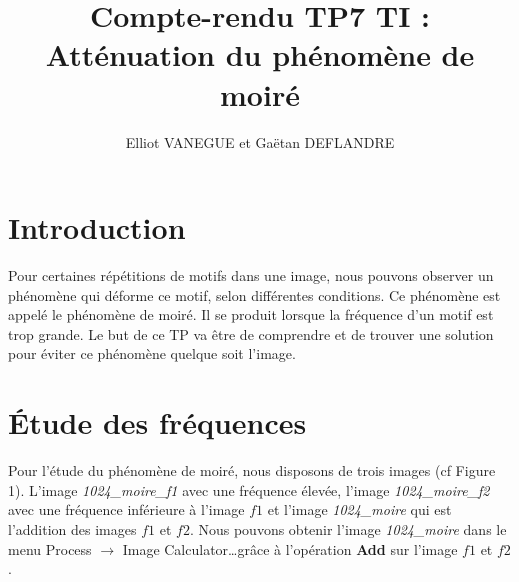 \documentclass[a4paper,11pt]{article}
\title{Compte-rendu TP7 TI : Atténuation du phénomène de moiré}
\author{Elliot VANEGUE et Gaëtan DEFLANDRE}
\begin{document}


  \maketitle
  
  \mbox{}
  \newpage
  \clearpage
  
  \section*{Introduction}
  Pour certaines répétitions de motifs dans une image, nous pouvons observer un phénomène qui déforme ce motif, selon différentes conditions. 
  Ce phénomène est appelé le phénomène de moiré. Il se produit lorsque la fréquence d’un motif est trop grande. Le but de ce TP va être de 
  comprendre et de trouver une solution pour éviter ce phénomène quelque soit l’image.\\
 
  \section{Étude des fréquences}
  Pour l’étude du phénomène de moiré, nous disposons de trois images (cf Figure 1). L’image \textit{1024\_moire\_f1} avec une fréquence élevée, 
  l’image \textit{1024\_moire\_f2} avec une fréquence inférieure à l’image $f1$ et l’image \textit{1024\_moire} qui est l’addition des images 
  $f1$ et $f2$. Nous pouvons obtenir l’image \textit{1024\_moire} dans le menu Process $\rightarrow$ Image Calculator\ldots grâce à l’opération 
  \textbf{Add} sur l’image $f1$ et $f2$.\\
\end{document}
